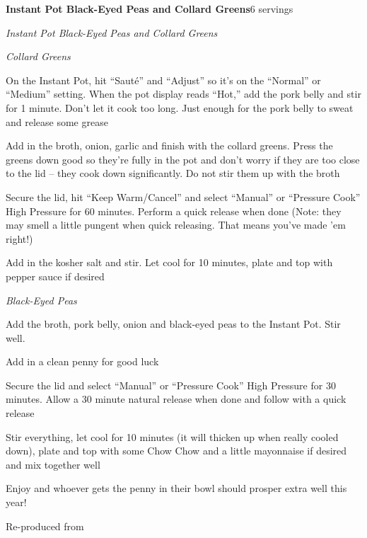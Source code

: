 \documentclass[../recipe-collections/cooking.tex]{subfiles}
\begin{document}
\begin{recipe}{\textbf{Instant Pot Black-Eyed Peas and Collard Greens}}{6 servings}{}

  \freeform{}\textit{Instant Pot Black-Eyed Peas and Collard Greens}

  \freeform{}\textit{Collard Greens}

  

  On the Instant Pot, hit “Sauté” and “Adjust” so it’s on the “Normal” or 
  “Medium” setting. When the pot display reads “Hot,” add the pork belly and 
  stir for 1 minute. Don’t let it cook too long. Just enough for the pork 
  belly to sweat and release some grease


  Add in the broth, onion, garlic and finish with the collard greens. Press 
  the greens down good so they’re fully in the pot and don’t worry if they are 
  too close to the lid – they cook down significantly. Do not stir them up 
  with the broth

  Secure the lid, hit “Keep Warm/Cancel” and select “Manual” or “Pressure 
  Cook” High Pressure for 60 minutes. Perform a quick release when done (Note: 
  they may smell a little pungent when quick releasing. That means you’ve 
  made ’em right!)

  Add in the kosher salt and stir. Let cool for 10 minutes, plate and 
  top with pepper sauce if desired

  \freeform{}\textit{Black-Eyed Peas}


  Add the broth, pork belly, onion and black-eyed peas to the Instant Pot. 
  Stir well.

  Add in a clean penny for good luck

  Secure the lid and select “Manual” or “Pressure Cook” High Pressure for 30 
  minutes. Allow a 30 minute natural release when done and follow with a 
  quick release

  Stir everything, let cool for 10 minutes (it will thicken up when really 
  cooled down), plate and top with some Chow Chow and a little mayonnaise if 
  desired and mix together well

  Enjoy and whoever gets the penny in their bowl should prosper extra well 
  this year!

\end{recipe}

Re-produced from  \autocite{PressureLuck_BlackEyedPeasAndGreens_2017}
\end{document}
